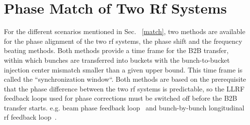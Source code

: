 \section{Phase Match of Two Rf Systems}
\label{two_sync_methods}
For the different scenarios mentioned in Sec. ~\ref{match}, two methods are available for the phase alignment of the two rf systems, the phase shift and the frequency beating methods. Both methods provide a time frame for the B2B transfer, within which bunches are transferred into buckets with the bunch-to-bucket injection center mismatch smaller than a given upper bound. This time frame is called the ``synchronization window``. Both methods are based on the prerequisite that the phase difference between the two rf systems is predictable, so the LLRF feedback loops used for phase corrections must be switched off before the B2B transfer starts. e.g. beam phase feedback loop~\cite{grieser_beam_2015} and bunch-by-bunch longitudinal rf feedback loop~\cite{gross_bunch-by-bunch_2015}.




